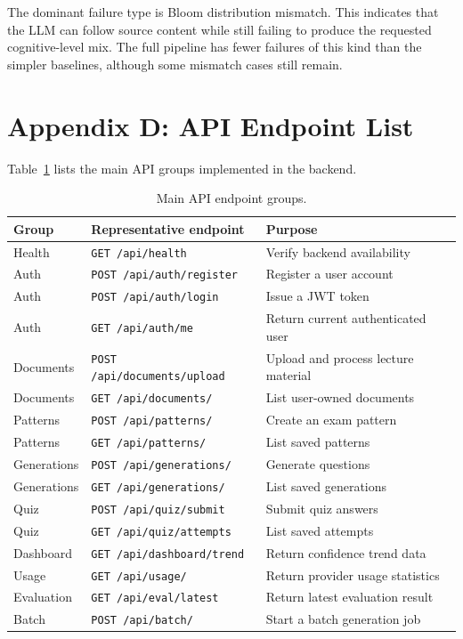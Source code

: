 \documentclass[12pt,a4paper]{article}
\begin{document}
The dominant failure type is Bloom distribution mismatch. This indicates
that the LLM can follow source content while still failing to produce the
requested cognitive-level mix. The full pipeline has fewer failures of this
kind than the simpler baselines, although some mismatch cases still remain.

\section*{Appendix D: API Endpoint List}

Table~\ref{tab:appendix-api} lists the main API groups implemented in the
backend.

\begin{longtable}{@{}p{2.7cm}p{4.5cm}p{6.0cm}@{}}
  \caption{Main API endpoint groups.}
  \label{tab:appendix-api}\\
  \toprule
  \textbf{Group} & \textbf{Representative endpoint} & \textbf{Purpose} \\
  \midrule
  Health & \texttt{GET /api/health} & Verify backend availability \\
  Auth & \texttt{POST /api/auth/register} & Register a user account \\
  Auth & \texttt{POST /api/auth/login} & Issue a JWT token \\
  Auth & \texttt{GET /api/auth/me} & Return current authenticated user \\
  Documents & \texttt{POST /api/documents/upload} & Upload and process lecture material \\
  Documents & \texttt{GET /api/documents/} & List user-owned documents \\
  Patterns & \texttt{POST /api/patterns/} & Create an exam pattern \\
  Patterns & \texttt{GET /api/patterns/} & List saved patterns \\
  Generations & \texttt{POST /api/generations/} & Generate questions \\
  Generations & \texttt{GET /api/generations/} & List saved generations \\
  Quiz & \texttt{POST /api/quiz/submit} & Submit quiz answers \\
  Quiz & \texttt{GET /api/quiz/attempts} & List saved attempts \\
  Dashboard & \texttt{GET /api/dashboard/trend} & Return confidence trend data \\
  Usage & \texttt{GET /api/usage/} & Return provider usage statistics \\
  Evaluation & \texttt{GET /api/eval/latest} & Return latest evaluation result \\
  Batch & \texttt{POST /api/batch/} & Start a batch generation job \\
  \bottomrule
\end{longtable}
\end{document}
